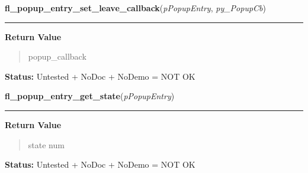     \vspace{0.5ex}

\hspace{.8\funcindent}\begin{boxedminipage}{\funcwidth}

    \raggedright \textbf{fl\_popup\_entry\_set\_leave\_callback}(\textit{pPopupEntry}, \textit{py\_PopupCb})

    \vspace{-1.5ex}

    \rule{\textwidth}{0.5\fboxrule}
\setlength{\parskip}{2ex}
\setlength{\parskip}{1ex}
      \textbf{Return Value}
    \vspace{-1ex}

      \begin{quote}
      popup\_callback

      \end{quote}

\textbf{Status:} Untested + NoDoc + NoDemo = NOT OK



    \end{boxedminipage}

    \label{xformslib:library:fl_popup_entry_get_state}

    \vspace{0.5ex}

\hspace{.8\funcindent}\begin{boxedminipage}{\funcwidth}

    \raggedright \textbf{fl\_popup\_entry\_get\_state}(\textit{pPopupEntry})

    \vspace{-1.5ex}

    \rule{\textwidth}{0.5\fboxrule}
\setlength{\parskip}{2ex}
\setlength{\parskip}{1ex}
      \textbf{Return Value}
    \vspace{-1ex}

      \begin{quote}
      state num

      \end{quote}

\textbf{Status:} Untested + NoDoc + NoDemo = NOT OK



    \end{boxedminipage}

